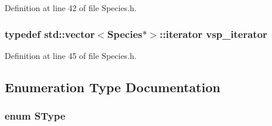 Definition at line 42 of file Species.\-h.

\hypertarget{group__Chemistry_ga3445ce7f270a9e9eb12a76b1da415dc4}{
\subsubsection[{vsp\-\_\-iterator}]{\setlength{\rightskip}{0pt plus 5cm}typedef std\-::vector$<${\bf Species}$\ast$$>$\-::iterator {\bf vsp\-\_\-iterator}}}\label{group__Chemistry_ga3445ce7f270a9e9eb12a76b1da415dc4}


Definition at line 45 of file Species.\-h.



\subsection{Enumeration Type Documentation}
\hypertarget{group__Chemistry_ga49104ff0a7d4118feb179c2f1c906f12}{
\subsubsection[{S\-Type}]{\setlength{\rightskip}{0pt plus 5cm}enum {\bf S\-Type}}}\label{group__Chemistry_ga49104ff0a7d4118feb179c2f1c906f12}
